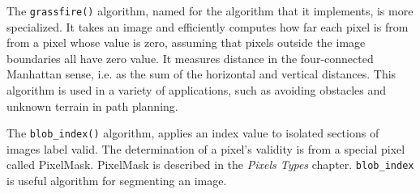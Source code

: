 The \verb#grassfire()# algorithm, named for the algorithm that
it implements, is more specialized.  It takes an image and
efficiently computes how far each pixel is from from a pixel
whose value is zero, assuming that pixels outside the image
boundaries all have zero value.  It measures distance in the
four-connected Manhattan sense, i.e. as the sum of the
horizontal and vertical distances.  This algorithm is used in
a variety of applications, such as avoiding obstacles and
unknown terrain in path planning.

The \verb#blob_index()# algorithm, applies an index value to isolated
sections of images label valid. The determination of a pixel's
validity is from a special pixel called PixelMask. PixelMask is
described in the \emph{Pixels Types} chapter. \verb#blob_index# is
useful algorithm for segmenting an image.




